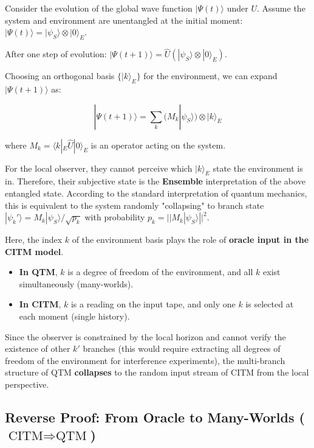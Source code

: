 Consider the evolution of the global wave function $|\Psi(t)\rangle$ under $U$. Assume the system and environment are unentangled at the initial moment: $|\Psi(t)\rangle = |\psi_S\rangle \otimes |0\rangle_E$.

After one step of evolution: $|\Psi(t+1)\rangle = \hat{U} (|\psi_S\rangle \otimes |0\rangle_E)$.

Choosing an orthogonal basis $\{|k\rangle_E\}$ for the environment, we can expand $|\Psi(t+1)\rangle$ as:

\begin{equation}
|\Psi(t+1)\rangle = \sum_k (M_k |\psi_S\rangle) \otimes |k\rangle_E
\end{equation}

where $M_k = \langle k|_E \hat{U} |0\rangle_E$ is an operator acting on the system.

For the local observer, they cannot perceive which $|k\rangle_E$ state the environment is in. Therefore, their subjective state is the \textbf{Ensemble} interpretation of the above entangled state. According to the standard interpretation of quantum mechanics, this is equivalent to the system randomly "collapsing" to branch state $|\psi_k'\rangle = M_k |\psi_S\rangle / \sqrt{p_k}$ with probability $p_k = || M_k |\psi_S\rangle ||^2$.

Here, the index $k$ of the environment basis plays the role of \textbf{oracle input in the CITM model}.

\begin{itemize}
\item \textbf{In QTM}, $k$ is a degree of freedom of the environment, and all $k$ exist simultaneously (many-worlds).

\item \textbf{In CITM}, $k$ is a reading on the input tape, and only one $k$ is selected at each moment (single history).
\end{itemize}

Since the observer is constrained by the local horizon and cannot verify the existence of other $k'$ branches (this would require extracting all degrees of freedom of the environment for interference experiments), the multi-branch structure of QTM \textbf{collapses} to the random input stream of CITM from the local perspective.

\subsection{Reverse Proof: From Oracle to Many-Worlds ($\text{CITM} \Rightarrow \text{QTM}$)}

